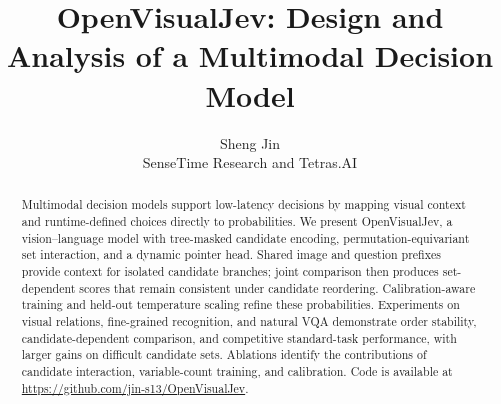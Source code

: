 \documentclass[11pt]{article}
\title{OpenVisualJev: Design and Analysis of a Multimodal Decision Model}
\author{Sheng Jin \\ SenseTime Research and Tetras.AI}
\date{}
\begin{document}
\maketitle
{}
\begin{abstract}
Multimodal decision models support low-latency decisions by mapping visual context and runtime-defined choices directly to probabilities. We present OpenVisualJev, a vision--language model with tree-masked candidate encoding, permutation-equivariant set interaction, and a dynamic pointer head. Shared image and question prefixes provide context for isolated candidate branches; joint comparison then produces set-dependent scores that remain consistent under candidate reordering. Calibration-aware training and held-out temperature scaling refine these probabilities. Experiments on visual relations, fine-grained recognition, and natural VQA demonstrate order stability, candidate-dependent comparison, and competitive standard-task performance, with larger gains on difficult candidate sets. Ablations identify the contributions of candidate interaction, variable-count training, and calibration. Code is available at \url{https://github.com/jin-s13/OpenVisualJev}.
\end{abstract}






\label{main-text-end}
\clearpage




\end{document}
